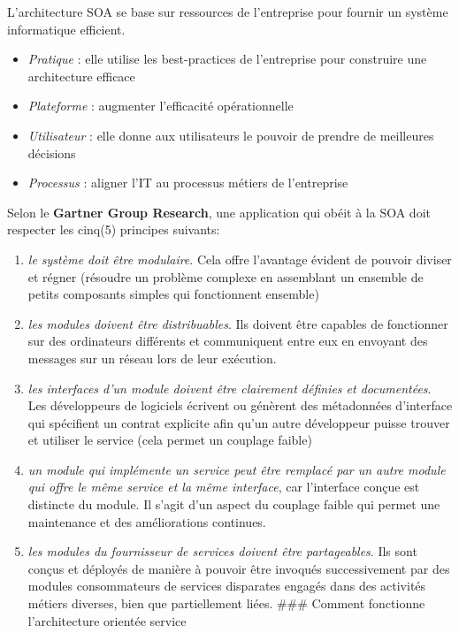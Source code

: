\documentclass[
]{book}
\providecommand{\tightlist}{%
  \setlength{\itemsep}{0pt}\setlength{\parskip}{0pt}}
\theoremstyle{definition}
\theoremstyle{definition}
\theoremstyle{definition}
\theoremstyle{definition}
\theoremstyle{remark}
\begin{document}
L'architecture SOA se base sur ressources de l'entreprise pour fournir un système informatique efficient.

\begin{itemize}
\tightlist
\item
  \emph{Pratique} : elle utilise les best-practices de l'entreprise pour construire une architecture efficace
\item
  \emph{Plateforme} : augmenter l'efficacité opérationnelle
\item
  \emph{Utilisateur} : elle donne aux utilisateurs le pouvoir de prendre de meilleures décisions
\item
  \emph{Processus} : aligner l'IT au processus métiers de l'entreprise
\end{itemize}

Selon le \textbf{Gartner Group Research}, une application qui obéit à la SOA doit respecter les cinq(5) principes suivants:

\begin{enumerate}
\def\labelenumi{\arabic{enumi}.}
\tightlist
\item
  \emph{le système doit être modulaire}. Cela offre l'avantage évident de pouvoir diviser et régner (résoudre un problème complexe en assemblant un ensemble de petits composants simples qui fonctionnent ensemble)
\item
  \emph{les modules doivent être distribuables}. Ils doivent être capables de fonctionner sur des ordinateurs différents et communiquent entre eux en envoyant des messages sur un réseau lors de leur exécution.
\item
  \emph{les interfaces d'un module doivent être clairement définies et documentées}. Les développeurs de logiciels écrivent ou génèrent des métadonnées d'interface qui spécifient un contrat explicite afin qu'un autre développeur puisse trouver et utiliser le service (cela permet un couplage faible)
\item
  \emph{un module qui implémente un service peut être remplacé par un autre module qui offre le même service et la même interface}, car l'interface conçue est distincte du module. Il s'agit d'un aspect du couplage faible qui permet une maintenance et des améliorations continues.
\item
  \emph{les modules du fournisseur de services doivent être partageables}. Ils sont conçus et déployés de manière à pouvoir être invoqués successivement par des modules consommateurs de services disparates engagés dans des activités métiers diverses, bien que partiellement liées.
  \#\#\# Comment fonctionne l'architecture orientée service
\end{enumerate}
\end{document}
